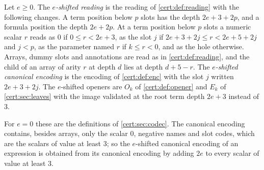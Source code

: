 \begin{definition}\label{cert:def:offset}
Let $e\ge 0$. The \emph{$e$-shifted reading} is the reading of
\cref{cert:def:reading} with the following changes. A term position below $p$
slots has the depth $2e+3+2p$, and a formula position the depth $2e+2p$. At a
term position below $p$ slots a numeric scalar $r$ reads as $0$ if
$0\le r<2e+3$, as the slot $j$ if $2e+3+2j\le r<2e+5+2j$ and $j<p$, as the
parameter named $r$ if $k\le r<0$, and as the hole otherwise. Arrays, dummy
slots and annotations are read as in \cref{cert:def:reading}, and the child of
an array of arity $r$ at depth $d$ lies at depth $d+5-r$. The
\emph{$e$-shifted canonical encoding} is the encoding of \cref{cert:def:enc}
with the slot $j$ written $2e+3+2j$. The $e$-shifted openers are $O_k$ of
\cref{cert:def:opener} and $E_k$ of \cref{cert:sec:leaves} with the image
validated at the root term depth $2e+3$ instead of $3$.
\end{definition}

For $e=0$ these are the definitions of \cref{cert:sec:codec}. The canonical
encoding contains, besides arrays, only the scalar $0$, negative names and
slot codes, which are the scalars of value at least $3$; so the $e$-shifted
canonical encoding of an expression is obtained from its canonical encoding by
adding $2e$ to every scalar of value at least $3$.


